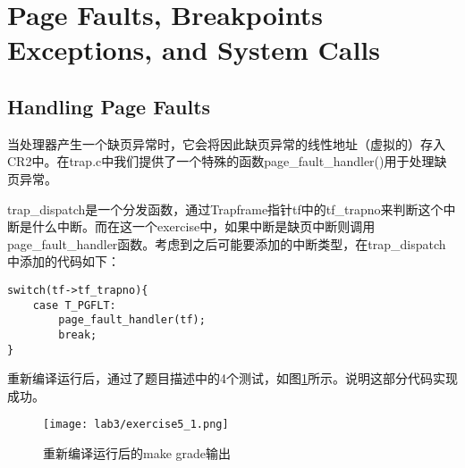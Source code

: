 \section{Page Faults, Breakpoints Exceptions, and System Calls}
\subsection{Handling Page Faults}
\par 当处理器产生一个缺页异常时，它会将因此缺页异常的线性地址（虚拟的）存入CR2中。在trap.c中我们提供了一个特殊的函数page\_fault\_handler()用于处理缺页异常。
\begin{exerciseSolution}{5}
    \par trap\_dispatch是一个分发函数，通过Trapframe指针tf中的tf\_trapno来判断这个中断是什么中断。而在这一个exercise中，如果中断是缺页中断则调用page\_fault\_handler函数。考虑到之后可能要添加的中断类型，在trap\_dispatch中添加的代码如下：
    \begin{lstlisting}
switch(tf->tf_trapno){
    case T_PGFLT:
        page_fault_handler(tf);
        break;
}
    \end{lstlisting}
    \par 重新编译运行后，通过了题目描述中的4个测试，如图\ref{fig:lab3/exercise5_1}所示。说明这部分代码实现成功。
    \begin{figure}[htb]
        \centering
        \texttt{[image: lab3/exercise5\_1.png]}
        \caption{重新编译运行后的make grade输出}
        \label{fig:lab3/exercise5_1}
    \end{figure}
\end{exerciseSolution}


